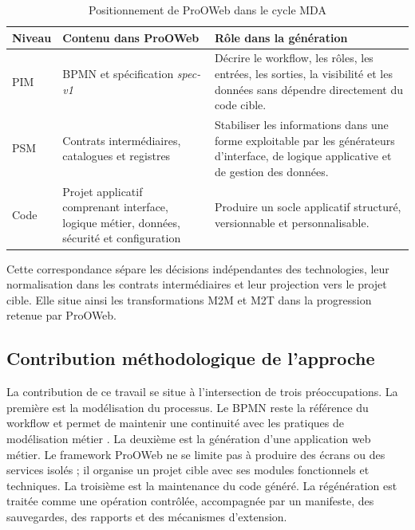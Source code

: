 \begin{table}[H]
\centering
\caption{Positionnement de ProOWeb dans le cycle MDA}
\label{tab:chap3-positionnement-mda}
\begin{tabularx}{\textwidth}{p{3.2cm}p{5.2cm}X}
\toprule
\textbf{Niveau} & \textbf{Contenu dans ProOWeb} & \textbf{Rôle dans la génération} \\
\midrule
PIM & BPMN et spécification \textit{spec-v1} & Décrire le workflow, les rôles, les entrées, les sorties, la visibilité et les données sans dépendre directement du code cible. \\
PSM & Contrats intermédiaires, catalogues et registres & Stabiliser les informations dans une forme exploitable par les générateurs d'interface, de logique applicative et de gestion des données. \\
Code & Projet applicatif comprenant interface, logique métier, données, sécurité et configuration & Produire un socle applicatif structuré, versionnable et personnalisable. \\
\bottomrule
\end{tabularx}
\end{table}

Cette correspondance sépare les décisions indépendantes des technologies, leur
normalisation dans les contrats intermédiaires et leur projection vers le projet
cible. Elle situe ainsi les transformations M2M et M2T dans la progression
retenue par ProOWeb.


\subsection{Contribution méthodologique de l'approche}

La contribution de ce travail se situe à l'intersection de trois préoccupations. La première est la modélisation du processus. Le BPMN reste la référence du workflow et permet de maintenir une continuité avec les pratiques de modélisation métier \cite{zemtsopNdadji2022workflowsWeb}. La deuxième est la génération d'une application web métier. Le framework ProOWeb ne se limite pas à produire des écrans ou des services isolés ; il organise un projet cible avec ses modules fonctionnels et techniques. La troisième est la maintenance du code généré. La régénération est traitée comme une opération contrôlée, accompagnée par un manifeste, des sauvegardes, des rapports et des mécanismes d'extension.

